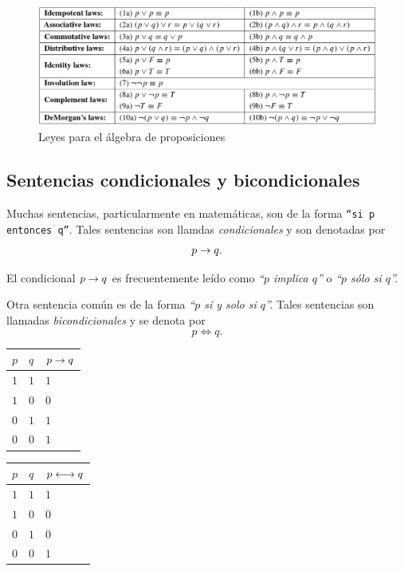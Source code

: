 \begin{figure}
	\centering
	\includegraphics[width=0.7\linewidth]{md/tabla_4-1}
 \caption{Leyes para el álgebra de proposiciones}
\label{fig:tabla:4.1}
\end{figure}



\subsection{Sentencias condicionales y bicondicionales}


 Muchas sentencias, particularmente en matem\'aticas, son de la forma \texttt{``si $p$ entonces $q$''}.  Tales sentencias son llamdas \emph{condicionales} y son denotadas por 
 $$
 p \rightarrow q.
 $$ 



 El condicional $p \rightarrow q$ es frecuentemente le\'ido como \emph{``$p$ implica $q$''} o \emph{``$p$ s\'olo si $q$''.}



 Otra sentencia com\'un es de la forma \emph{``$p$ si y solo si $q$''.}  Tales sentencias son llamadas \emph{bicondicionales} y se denota por 
 $$
 p \iff q.
 $$



 \begin{tdv}[Condicional]
\begin{center}
 \begin{tabular}{|l|l||l|} \hline
$p$ & $q$ & $p \rightarrow q$ \\ \hline
$1$ & $1$ & $1$ \\ \hline
$1$ & $0$ & $0$ \\ \hline
$0$ & $1$ & $1$ \\ \hline
$0$ & $0$ & $1$ \\ \hline
\end{tabular}
\end{center}

 \end{tdv}




 \begin{tdv}[Bicondicional]
\begin{center}
\begin{tabular}{|l|l||l|} \hline
$p$ & $q$ & $p \longleftrightarrow q$ \\ \hline
$1$ & $1$ & $1$ \\ \hline
$1$ & $0$ & $0$ \\ \hline
$0$ & $1$ & $0$ \\ \hline
$0$ & $0$ & $1$ \\ \hline
\end{tabular}
\end{center}

 \end{tdv}




